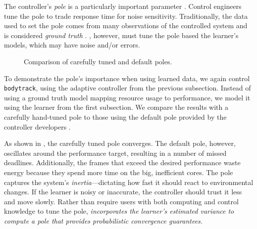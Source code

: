 The controller's \emph{pole} is a particularly important parameter
\cite{HandbookControl}.  Control engineers tune the pole to trade
response time for noise sensitivity.  Traditionally, the data used to
set the pole comes from many observations of the controlled system and
is considered \emph{ground truth} \cite{Hellerstein2004a,sysid}.
\SYSTEM{}, however, must tune the pole based the learner's models,
which may have noise and/or errors.


\begin{figure} 

\caption{Comparison of carefully tuned and default poles.}
\label{fig:not-simple}
\end{figure}
To demonstrate the pole's importance when using learned data, we again
control \texttt{bodytrack}, using the adaptive controller from the
previous subsection. Instead of using a ground truth model mapping
resource usage to performance, we model it using the learner from the
first subsection.  We compare the results with a carefully hand-tuned
pole to those using the default pole provided by the controller
developers \cite{POET}.

As shown in , the carefully tuned pole
converges. The default pole, however, oscillates around the
performance target, resulting in a number of missed deadlines.
Additionally, the frames that exceed the desired performance waste
energy because they spend more time on the big, inefficient cores. The
pole captures the system's \emph{inertia}---dictating how fast it
should react to environmental changes.  If the learner is noisy or
inaccurate, the controller should trust it less and move slowly.
Rather than require users with both computing and control knowledge to
tune the pole, \emph{\SYSTEM{} incorporates the learner's estimated
  variance to compute a pole that provides probabilistic convergence
  guarantees.}


